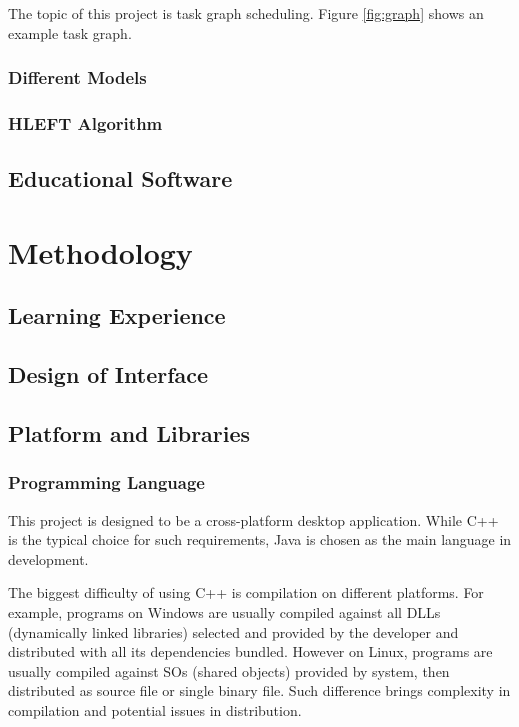 \documentclass[msc,deptreport, cs]{infthesis}
\begin{document}
The topic of this project is task graph scheduling. Figure \ref{fig:graph} shows an example task graph.

\subsection{Different Models}

\subsection{HLEFT Algorithm}

\section{Educational Software}

\chapter{Methodology}

\section{Learning Experience}

\section{Design of Interface}

\section{Platform and Libraries}

\subsection{Programming Language}

This project is designed to be a cross-platform desktop application. While C++ is the typical choice for such requirements, Java is chosen as the main language in development. 

The biggest difficulty of using C++ is compilation on different platforms. For example, programs on Windows are usually compiled against all DLLs (dynamically linked libraries) selected and provided by the developer and distributed with all its dependencies bundled. However on Linux, programs are usually compiled against SOs (shared objects) provided by system, then distributed as source file or single binary file. Such difference brings complexity in compilation and potential issues in distribution.
\end{document}
